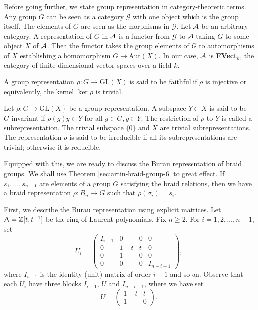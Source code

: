 Before going further, we state group representation in category-theoretic terms. Any group $G$ can be seen as a category $\mathcal{G}$ with one object which is the group itself. The elements of $G$ are seen as the morphisms in $\mathcal{G}$. Let $\mathcal{A}$ be an arbitrary category. A representation of $G$ in $\mathcal{A}$ is a functor from $\mathcal{G}$ to $\mathcal{A}$ taking $G$ to some object $X$ of $\mathcal{A}$. Then the functor takes the group elements of $G$ to automorphisms of $X$ establishing a homomorphism $G \to \text{Aut}(X)$. In our case, $\mathcal{A}$ is \textbf{FVect$_k$}, the category of finite dimensional vector spaces over a field $k$. 

\begin{definition}
\label{sec:representations-3}
  A group representation $\rho : G \to \text{GL}(X)$ is said to be faithful if $\rho$ is injective or equivalently, the kernel $\ker{\rho}$ is trivial.
\end{definition}

\begin{definition}
\label{sec:representations-4}
Let $\rho : G \to \text{GL}(X)$ be a group representation. A subspace $Y \subset X$ is said to be $G$-invariant if $\rho(g)y \in Y$ for all $g \in G, y \in Y$. The restriction of $\rho$ to $Y$ is called a subrepresentation. The trivial subspace $\{0\}$ and $X$ are trivial subrepresentations. The representation $\rho$ is said to be irreducible if all its subrepresentations are trivial; otherwise it is reducible.
\end{definition}

Equipped with this, we are ready to discuss the Burau representation of braid groups. We shall use Theorem \ref{sec:artin-braid-group-6} to great effect. If $s_1,\ldots, s_{n-1}$ are elements of a group $G$ satisfying the braid relations, then we have a braid representation $\rho : B_n \to G$ such that $\rho(\sigma_i) = s_i$.

First, we describe the Burau representation using explicit matrices. Let $\Uplambda = \mathbb{Z}[t, t^{-1}]$ be the ring of Laurent polynomials. Fix $n\geq 2$. For $i=1,2,\ldots, n-1$, set 
\begin{equation}
  U_i = \begin{pmatrix} I_{i-1} & 0 & 0 & 0 \\
    0 & 1-t & t & 0 \\
    0 & 1 & 0 & 0 \\
  0 & 0 & 0 & I_{n-i-1}\end{pmatrix},
\end{equation}
where $I_{i-1}$ is the identity (unit) matrix of order $i-1$ and so on. Observe that each $U_i$ have three blocks $I_{i-1}$, $U$ and $I_{n-i-1}$, where we have set 
\begin{equation}
\label{eq:8}
U = \begin{pmatrix} 1-t & t \\ 1 & 0 \end{pmatrix}.
\end{equation}

